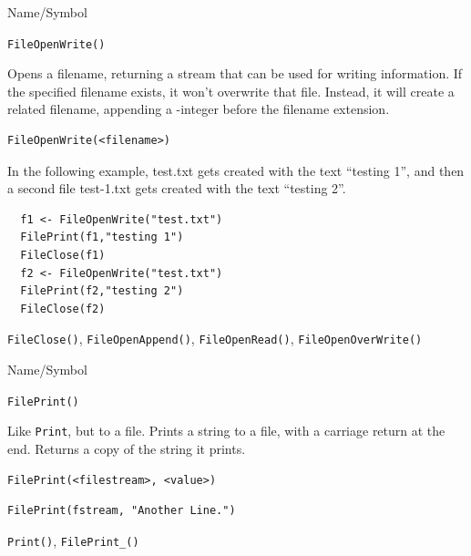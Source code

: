 \begin{desc}{Name/Symbol}
\item[Name/Symbol]	\verb+FileOpenWrite()+

\item[Description] Opens a filename, returning a stream that can be
  used for writing information.  If the specified filename exists, it
  won't overwrite that file.  Instead, it will create a related
  filename, appending a -integer before the filename extension.


\item[Usage]
\begin{verbatim}
FileOpenWrite(<filename>)
\end{verbatim}

\item[Example]	

In the following example, test.txt gets created with the text
``testing 1'', and then a second file test-1.txt gets created with the
text ``testing 2''.

\begin{verbatim}
  f1 <- FileOpenWrite("test.txt")
  FilePrint(f1,"testing 1")
  FileClose(f1)
  f2 <- FileOpenWrite("test.txt")
  FilePrint(f2,"testing 2")
  FileClose(f2)
 \end{verbatim}

\item[See Also]	\verb+FileClose()+, \verb+FileOpenAppend()+, \verb+FileOpenRead()+, \verb+FileOpenOverWrite()+
\end{desc}



\begin{desc}{Name/Symbol}
\item[Name/Symbol]	\verb+FilePrint()+

\item[Description]	Like \verb+Print+, but to a file.  Prints a string to a file, 
		with a carriage return at the end.  Returns a
  copy of the string it prints.
	
\item[Usage]
\begin{verbatim}
FilePrint(<filestream>, <value>)
\end{verbatim}

\item[Example]
\begin{verbatim}
FilePrint(fstream, "Another Line.")
\end{verbatim}

\item[See Also]	\verb+Print()+, \verb+FilePrint_()+
\end{desc}



